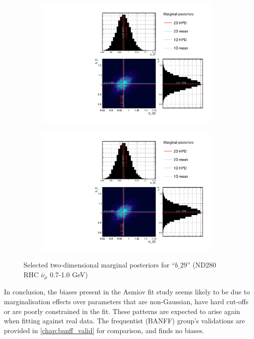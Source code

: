 \begin{figure}[h]
\begin{subfigure}[t]{0.24\textwidth}
		\includegraphics[width=\textwidth, trim={0mm 0mm 0mm 0mm}, clip,page=50]{figures/mach3/mcmc/2017b_NewDet_3Xsec_4Det_5Flux_NewXSecTune_Asimov_merge_b29}
	\end{subfigure}
	\begin{subfigure}[t]{0.24\textwidth}
		\includegraphics[width=\textwidth, trim={0mm 0mm 0mm 0mm}, clip,page=61]{figures/mach3/mcmc/2017b_NewDet_3Xsec_4Det_5Flux_NewXSecTune_Asimov_merge_b29}
	\end{subfigure}
	\caption{Selected two-dimensional marginal posteriors for ``$b\_29$'' (ND280 RHC $\bar{\nu}_\mu$ 0.7-1.0 GeV)}
	\label{fig:marginalisation_b29}
\end{figure}

In conclusion, the biases present in the Asmiov fit study seems likely to be due to marginalisation effects over parameters that are non-Gaussian, have hard cut-offs or are poorly constrained in the fit. These patterns are expected to arise again when fitting against real data. The frequentist (BANFF) group's validations are provided in \autoref{chap:banff_valid} for comparison, and finds no biases.

